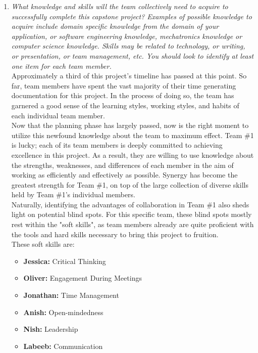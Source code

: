 \documentclass[12pt, titlepage]{article}
\begin{document}
\begin{enumerate}
  \item \textit{What knowledge and skills will the team collectively need to acquire to
          successfully complete this capstone project?  Examples of possible knowledge
          to acquire include domain specific knowledge from the domain of your
          application, or software engineering knowledge, mechatronics knowledge or
          computer science knowledge.  Skills may be related to technology, or writing,
          or presentation, or team management, etc.  You should look to identify at
          least one item for each team member.}\\

        Approximately a third of this project's timeline has passed at this point. So far, team members have spent the vast majority of their time generating documentation for this project. In the process of doing so, the team has garnered a good sense of the learning styles, working styles, and habits of each individual team member.\\

        Now that the planning phase has largely passed, now is the right moment to utilize this newfound knowledge about the team to maximum effect. Team \#1 is lucky; each of its team members is deeply committed to achieving excellence in this project. As a result, they are willing to use knowledge about the strengths, weaknesses, and differences of each member in the aim of working as efficiently and effectively as possible. Synergy has become the greatest strength for Team \#1, on top of the large collection of diverse skills held by Team \#1's individual members.\\

        Naturally, identifying the advantages of collaboration in Team \#1 also sheds light on potential blind spots. For this specific team, these blind spots mostly rest within the "soft skills", as team members already are quite proficient with the tools and hard skills necessary to bring this project to fruition.\\

        These soft skills are:
        \begin{itemize}
          \item \textbf{Jessica:} Critical Thinking
          \item \textbf{Oliver:} Engagement During Meetings
          \item \textbf{Jonathan:} Time Management
          \item \textbf{Anish:} Open-mindedness
          \item \textbf{Nish:} Leadership
          \item \textbf{Labeeb:} Communication
        \end{itemize}


\end{enumerate}
\end{document}
